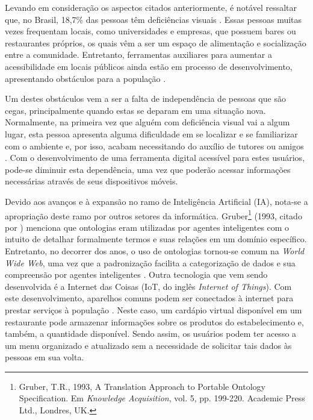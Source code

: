 Levando em consideração os aspectos citados anteriormente, é notável ressaltar que, no Brasil, 18,7\% das pessoas têm deficiências visuais \cite{IBGE2011}. Essas pessoas muitas vezes frequentam locais, como universidades e empresas, que possuem bares ou restaurantes próprios, os quais vêm a ser um espaço de alimentação e socialização entre a comunidade. Entretanto, ferramentas auxiliares para aumentar a acessibilidade em locais públicos ainda estão em processo de desenvolvimento, apresentando obstáculos para a população \cite{PATEL2012}.

Um destes obstáculos vem a ser a falta de independência de pessoas que são cegas, principalmente quando estas se deparam em uma situação nova. Normalmente, na primeira vez que alguém com deficiência visual vai a algum lugar, esta pessoa apresenta alguma dificuldade em se localizar e se familiarizar com o ambiente e, por isso, acabam necessitando do auxílio de tutores ou amigos \cite{DATRI2007}. Com o desenvolvimento de uma ferramenta digital acessível para estes usuários, pode-se diminuir esta dependência, uma vez que poderão acessar informações necessárias através de seus dispositivos móveis.

Devido aos avanços e à expansão no ramo de Inteligência Artificial (IA), nota-se a apropriação deste ramo por outros setores da informática. Gruber\footnote{Gruber, T.R., 1993,  A Translation Approach to Portable Ontology Specification. Em \emph{Knowledge Acquisition}, vol. 5, pp. 199-220. Academic Press Ltd., Londres, UK.} (1993, citado por \cite{NOY2001}) menciona que ontologias eram utilizadas por agentes inteligentes com o intuito de detalhar formalmente termos e suas relações em um domínio específico. Entretanto, no decorrer dos anos, o uso de ontologias tornou-se comum na \textit{World Wide Web}, uma vez que a padronização facilita a categorização de dados e sua compreensão por agentes inteligentes \cite{NOY2001}. Outra tecnologia que vem sendo desenvolvida é a Internet das Coisas (IoT, do inglês \emph{Internet of Things}). Com este desenvolvimento, aparelhos comuns podem ser conectados à internet para prestar serviços à população \cite{FRIESS2013} . Neste caso, um cardápio virtual disponível em um restaurante pode armazenar informações sobre os produtos do estabelecimento e, também, a quantidade disponível. Sendo assim, os usuários podem ter acesso a um menu organizado e atualizado sem a necessidade de solicitar tais dados às pessoas em sua volta.


